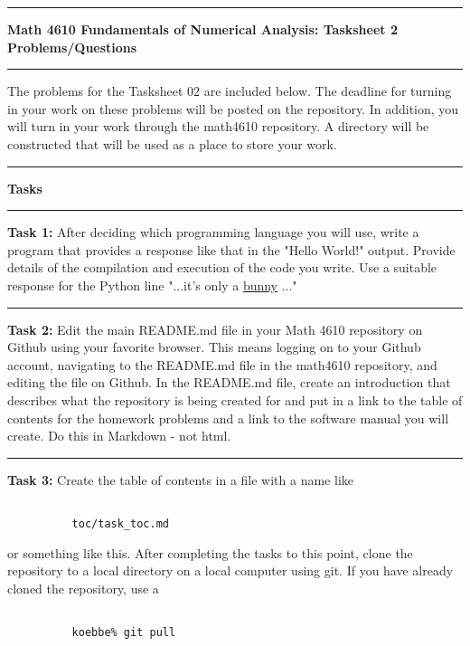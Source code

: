 \documentclass[10pt,fleqn]{article}
\begin{document}
\vskip0.1in\hrule\vskip0.1in \noindent
{\bf{\Large Math 4610 Fundamentals of Numerical Analysis: Tasksheet 2 Problems/Questions}}
\vskip0.1in\hrule\vskip0.1in \noindent
The problems for the Tasksheet 02 are included below. The deadline for turning
in your work on these problems will be posted on the repository. In addition,
you will turn in your work through the math4610 repository. A directory will be
constructed that will be used as a place to store your work.
\vskip0.1in\hrule\vskip0.1in \noindent
{\bf{\large Tasks}}
\vskip0.1in\hrule\vskip0.1in \noindent
\begin{trivlist}
  \item[\bf Task 1:] After deciding which programming language you will use,
        write a program that provides a response like that in the "Hello World!"
        output. Provide details of the compilation and execution of the code
        you write. Use a suitable response for the Python line "...it's only a
        \href{../audio/mp11.wav}{bunny} ..."
\vskip0.1in\hrule\vskip0.1in \noindent
  \item[\bf Task 2:] Edit the main README.md file in your Math 4610 repository
        on Github using your favorite browser. This means logging on to your
        Github account, navigating to the README.md file in the math4610
        repository, and editing the file on Github. In the README.md file,
        create an introduction that describes what the repository is being
        created for and put in a link to the table of contents for the homework
        problems and a link to the software manual you will create. Do this in
        Markdown - not html.
\vskip0.1in\hrule\vskip0.1in \noindent
  \item[\bf Task 3:] Create the table of contents in a file with a name like
        \begin{verbatim}

          toc/task_toc.md

        \end{verbatim}
        or something like this. After completing the tasks to this point, clone
        the repository to a local directory on a local computer using git. If
        you have already cloned the repository, use a
        \begin{verbatim}

          koebbe% git pull


\end{verbatim}
\end{trivlist}
\end{document}
